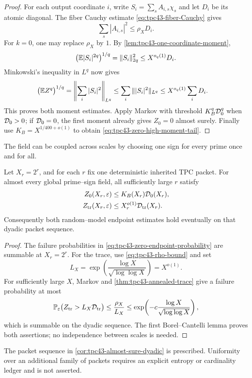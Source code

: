 \begin{proof}
For each output coordinate \(i\), write
\(S_i=\sum_sA_{i,s}\chi_s\) and let \(D_i\) be its atomic diagonal.
The fiber Cauchy estimate \eqref{eq:tpc43-fiber-Cauchy} gives
\begin{equation}
 \sum_s|A_{i,s}|^2\le\rho_XD_i.
 \label{eq:tpc43-coordinate-coefficient-l2}
\end{equation}
For \(k=0\), one may replace \(\rho_X\) by \(1\).  By
\cref{lem:tpc43-one-coordinate-moment},
\begin{equation}
 \bigl(\mathbb E|S_i|^{2q}\bigr)^{1/q}
 =\|S_i\|_{2q}^2
 \le X^{o_q(1)}D_i.
 \label{eq:tpc43-coordinate-Lq-square}
\end{equation}
Minkowski's inequality in \(L^q\) now gives
\begin{align}
 \bigl(\mathbb E Z^q\bigr)^{1/q}
 &=\left\|\sum_i|S_i|^2\right\|_{L^q}
 \le\sum_i\||S_i|^2\|_{L^q}
 \le X^{o_q(1)}\sum_iD_i.
 \label{eq:tpc43-Minkowski-moment}
\end{align}
This proves both moment estimates.  Apply Markov with threshold
\(K_B^q\mathcal D_0^q\) when \(\mathcal D_0>0\); if \(\mathcal D_0=0\), the first moment
already gives \(Z_0=0\) almost surely.  Finally use
\(K_B=X^{1/400+o(1)}\) to obtain
\eqref{eq:tpc43-zero-high-moment-tail}.
\end{proof}

The field can be coupled across scales by choosing one sign for every
prime once and for all.

\begin{corollary}
\label{cor:tpc43-almost-sure-dyadic}
Let \(X_r=2^r\), and for each \(r\) fix one deterministic inherited
TPC packet.  For almost every global prime--sign field, all sufficiently
large \(r\) satisfy
\begin{align}
 Z_0(X_r,\varepsilon)&\le K_B(X_r)\mathcal D_0(X_r),
 \label{eq:tpc43-as-zero}\\
 Z_{\rm tr}(X_r,\varepsilon)&\le X_r^{o(1)}\mathcal D_{\rm tr}(X_r).
 \label{eq:tpc43-as-trace}
\end{align}
Consequently both random--model endpoint estimates hold eventually on
that dyadic packet sequence.
\end{corollary}

\begin{proof}
The failure probabilities in
\eqref{eq:tpc43-zero-endpoint-probability} are summable at
\(X_r=2^r\).  For the trace, use
\eqref{eq:tpc43-rho-bound} and set
\begin{equation}
 L_X=\exp\!\left(\frac{\log X}{\sqrt{\log\log X}}\right)=X^{o(1)}.
 \label{eq:tpc43-summable-envelope}
\end{equation}
For sufficiently large \(X\), Markov and
\cref{thm:tpc43-annealed-trace} give a failure probability at most
\begin{equation}
 \mathbb P_\varepsilon\bigl(Z_{\rm tr}>L_X\mathcal D_{\rm tr}\bigr)
 \le
 \frac{\rho_X}{L_X}
 \le\exp\!\left(-c\frac{\log X}{\sqrt{\log\log X}}\right),
 \label{eq:tpc43-summable-trace-tail}
\end{equation}
which is summable on the dyadic sequence.  The first Borel--Cantelli
lemma proves both assertions; no independence between scales is needed.
\end{proof}

The packet sequence in \cref{cor:tpc43-almost-sure-dyadic} is prescribed.
Uniformity over an additional family of packets requires an explicit
entropy or cardinality ledger and is not asserted.
